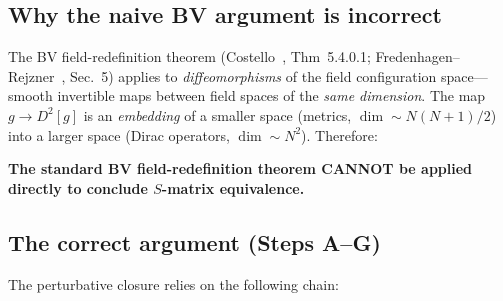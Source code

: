 \documentclass[11pt,a4paper]{article}
\begin{document}
\subsection{Why the naive BV argument is incorrect}

The BV field-redefinition theorem (Costello~\cite{Costello2011},
Thm~5.4.0.1; Fredenhagen--Rejzner~\cite{FR2012}, Sec.~5) applies to
\emph{diffeomorphisms} of the field configuration space---smooth
invertible maps between field spaces of the \emph{same dimension}.
The map $g \to D^2[g]$ is an \emph{embedding} of a smaller space
(metrics, $\dim \sim N(N+1)/2$) into a larger space (Dirac operators,
$\dim \sim N^2$).  Therefore:

\medskip
\noindent\textbf{The standard BV field-redefinition theorem
CANNOT be applied directly to conclude $S$-matrix equivalence.}

\subsection{The correct argument (Steps A--G)}

The perturbative closure relies on the following chain:
\end{document}
